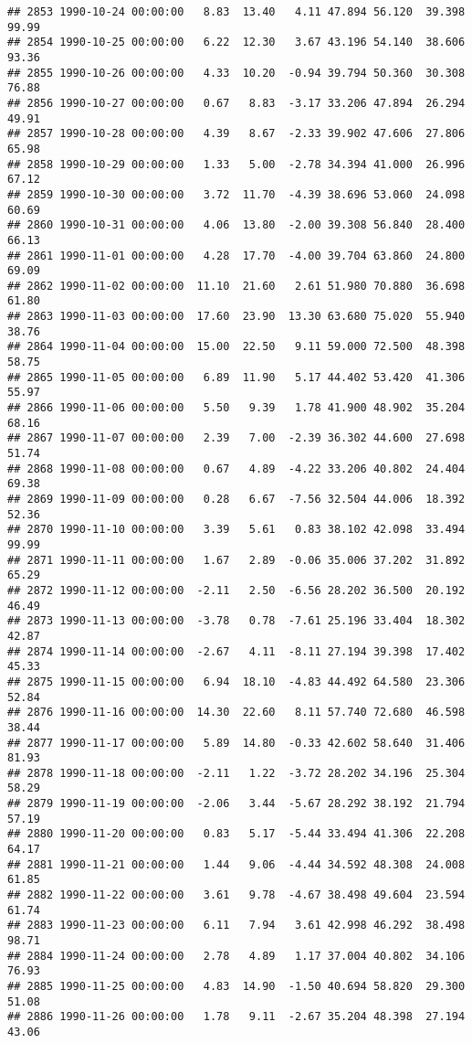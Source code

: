 \documentclass{article}\usepackage{graphicx, color}
\makeatletter
\newenvironment{kframe}{%
 \def\at@end@of@kframe{}%
 \ifinner\ifhmode%
  \def\at@end@of@kframe{\end{minipage}}%
  \begin{minipage}{\columnwidth}%
 \fi\fi%
 \def\FrameCommand##1{\hskip\@totalleftmargin \hskip-\fboxsep
 \colorbox{shadecolor}{##1}\hskip-\fboxsep
     \hskip-\linewidth \hskip-\@totalleftmargin \hskip\columnwidth}%
 \MakeFramed {\advance\hsize-\width
   \@totalleftmargin\z@ \linewidth\hsize
   \@setminipage}}%
 {\par\unskip\endMakeFramed%
 \at@end@of@kframe}
\newenvironment{knitrout}{}{} %
\makeatother
\begin{document}
\begin{knitrout}
\begin{kframe}
\begin{verbatim}
## 2853 1990-10-24 00:00:00   8.83  13.40   4.11 47.894 56.120  39.398  99.99
## 2854 1990-10-25 00:00:00   6.22  12.30   3.67 43.196 54.140  38.606  93.36
## 2855 1990-10-26 00:00:00   4.33  10.20  -0.94 39.794 50.360  30.308  76.88
## 2856 1990-10-27 00:00:00   0.67   8.83  -3.17 33.206 47.894  26.294  49.91
## 2857 1990-10-28 00:00:00   4.39   8.67  -2.33 39.902 47.606  27.806  65.98
## 2858 1990-10-29 00:00:00   1.33   5.00  -2.78 34.394 41.000  26.996  67.12
## 2859 1990-10-30 00:00:00   3.72  11.70  -4.39 38.696 53.060  24.098  60.69
## 2860 1990-10-31 00:00:00   4.06  13.80  -2.00 39.308 56.840  28.400  66.13
## 2861 1990-11-01 00:00:00   4.28  17.70  -4.00 39.704 63.860  24.800  69.09
## 2862 1990-11-02 00:00:00  11.10  21.60   2.61 51.980 70.880  36.698  61.80
## 2863 1990-11-03 00:00:00  17.60  23.90  13.30 63.680 75.020  55.940  38.76
## 2864 1990-11-04 00:00:00  15.00  22.50   9.11 59.000 72.500  48.398  58.75
## 2865 1990-11-05 00:00:00   6.89  11.90   5.17 44.402 53.420  41.306  55.97
## 2866 1990-11-06 00:00:00   5.50   9.39   1.78 41.900 48.902  35.204  68.16
## 2867 1990-11-07 00:00:00   2.39   7.00  -2.39 36.302 44.600  27.698  51.74
## 2868 1990-11-08 00:00:00   0.67   4.89  -4.22 33.206 40.802  24.404  69.38
## 2869 1990-11-09 00:00:00   0.28   6.67  -7.56 32.504 44.006  18.392  52.36
## 2870 1990-11-10 00:00:00   3.39   5.61   0.83 38.102 42.098  33.494  99.99
## 2871 1990-11-11 00:00:00   1.67   2.89  -0.06 35.006 37.202  31.892  65.29
## 2872 1990-11-12 00:00:00  -2.11   2.50  -6.56 28.202 36.500  20.192  46.49
## 2873 1990-11-13 00:00:00  -3.78   0.78  -7.61 25.196 33.404  18.302  42.87
## 2874 1990-11-14 00:00:00  -2.67   4.11  -8.11 27.194 39.398  17.402  45.33
## 2875 1990-11-15 00:00:00   6.94  18.10  -4.83 44.492 64.580  23.306  52.84
## 2876 1990-11-16 00:00:00  14.30  22.60   8.11 57.740 72.680  46.598  38.44
## 2877 1990-11-17 00:00:00   5.89  14.80  -0.33 42.602 58.640  31.406  81.93
## 2878 1990-11-18 00:00:00  -2.11   1.22  -3.72 28.202 34.196  25.304  58.29
## 2879 1990-11-19 00:00:00  -2.06   3.44  -5.67 28.292 38.192  21.794  57.19
## 2880 1990-11-20 00:00:00   0.83   5.17  -5.44 33.494 41.306  22.208  64.17
## 2881 1990-11-21 00:00:00   1.44   9.06  -4.44 34.592 48.308  24.008  61.85
## 2882 1990-11-22 00:00:00   3.61   9.78  -4.67 38.498 49.604  23.594  61.74
## 2883 1990-11-23 00:00:00   6.11   7.94   3.61 42.998 46.292  38.498  98.71
## 2884 1990-11-24 00:00:00   2.78   4.89   1.17 37.004 40.802  34.106  76.93
## 2885 1990-11-25 00:00:00   4.83  14.90  -1.50 40.694 58.820  29.300  51.08
## 2886 1990-11-26 00:00:00   1.78   9.11  -2.67 35.204 48.398  27.194  43.06

\end{verbatim}
\end{kframe}
\end{knitrout}
\end{document}
